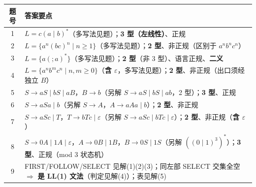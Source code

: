 \documentclass[12pt,a4paper,fontset=windows]{ctexart}
\newcommand{\imp}{\ensuremath{\Rightarrow}}
\begin{document}
\begin{center}
\renewcommand{\arraystretch}{1.3}
\setlength{\tabcolsep}{6pt}
\begin{tabular}{@{}c p{13.6cm}@{}}
\toprule
\textbf{题号} & \textbf{答案要点} \\
\midrule
1 & $L = c(a \mid b)^*$（多写法见题）；\textbf{3 型（左线性）}、正规 \\
2 & $L = \{a^n (bc)^n \mid n \ge 1\}$（多写法见题）；\textbf{2 型}、非正规（区别于 $a^n b^n c^n$） \\
3 & $L = \{a( ; a)^*\}$（多写法见题）；\textbf{2 型}（非 3 型）、语言正规、\textbf{二义} \\
4 & $L = \{a^n b^m c^n \mid n,m \ge 0\}$（\textbf{含 $\varepsilon$}，多写法见题）；\textbf{2 型}、非正规（出口须经独立 $B$） \\
5 & $S \to aS \mid bS \mid aB$，$B \to b$（另解 $S \to aS \mid bS \mid ab$，2 型）；\textbf{3 型}、正规 \\
6 & $S \to aSa \mid b$（另解 $S \to A$，$A \to aAa \mid b$）；\textbf{2 型}、非正规 \\
7 & $S \to aSc \mid T$，$T \to bTc \mid \varepsilon$（另解 $S \to aSc \mid bTc \mid \varepsilon$）；\textbf{2 型}、非正规（\textbf{含 $\varepsilon$}） \\
8 & $S \to 0A \mid 1A \mid \varepsilon$，$A \to 0B \mid 1B$，$B \to 0S \mid 1S$（另解 $((0 \mid 1)^3)^*$）；\textbf{3 型}、正规（mod 3 状态机） \\
9 & FIRST/FOLLOW/SELECT 见解(1)(2)(3)；同左部 SELECT 交集全空 \imp{} \textbf{是 LL(1) 文法}（判定见解(4)）；表见解(5) \\
\bottomrule
\end{tabular}
\end{center}
\end{document}
